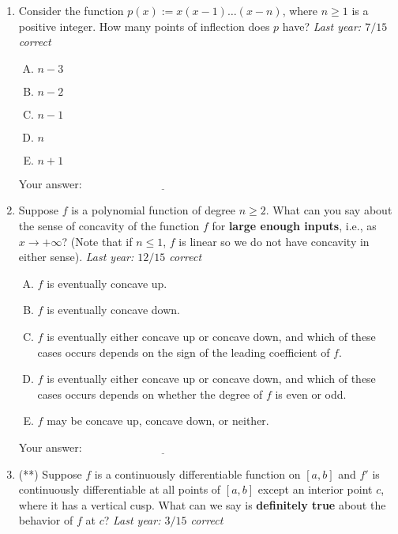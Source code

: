 \documentclass[10pt]{amsart}
\begin{document}
\begin{enumerate}
\item Consider the function $p(x) := x(x-1) \dots (x - n)$, where $n
  \ge 1$ is a positive integer. How many points of inflection does $p$
  have? {\em Last year: $7/15$ correct}

  \begin{enumerate}[(A)]
  \item $n - 3$
  \item $n - 2$
  \item $n - 1$
  \item $n$
  \item $n + 1$
  \end{enumerate}

  \vspace{0.1in}
  Your answer: $\underline{\qquad\qquad\qquad\qquad\qquad\qquad\qquad}$
  \vspace{0.6in}

\item Suppose $f$ is a polynomial function of degree $n \ge 2$. What
  can you say about the sense of concavity of the function $f$ for
  {\bf large enough inputs}, i.e., as $x \to +\infty$? (Note that if
  $n \le 1$, $f$ is linear so we do not have concavity in either
  sense). {\em Last year: $12/15$ correct}

  \begin{enumerate}[(A)]
  \item $f$ is eventually concave up.
  \item $f$ is eventually concave down.
  \item $f$ is eventually either concave up or concave down, and which
    of these cases occurs depends on the sign of the leading
    coefficient of $f$.
  \item $f$ is eventually either concave up or concave down, and which
    of these cases occurs depends on whether the degree of $f$ is even
    or odd.
  \item $f$ may be concave up, concave down, or neither.
  \end{enumerate}

  \vspace{0.1in}
  Your answer: $\underline{\qquad\qquad\qquad\qquad\qquad\qquad\qquad}$
  \vspace{0.6in}

\item (**) Suppose $f$ is a continuously differentiable function on $[a,b]$
  and $f'$ is continuously differentiable at all points of $[a,b]$
  except an interior point $c$, where it has a vertical cusp. What can
  we say is {\bf definitely true} about the behavior of $f$ at $c$?
  {\em Last year: $3/15$ correct}


\end{enumerate}
\end{document}
